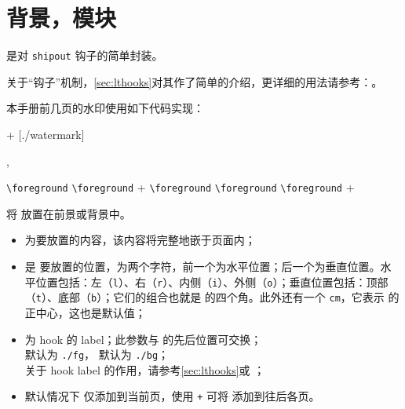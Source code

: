 \documentclass[twoside]{book}
\begin{document}
\section{背景，模块}

 是对 \texttt{shipout} 钩子的简单封装。

关于“钩子”机制，\cref{sec:lthooks}对其作了简单的介绍，更详细的用法请参考：。

本手册前几页的水印使用如下代码实现：
\begin{xample}
\background + [./watermark]{%
  }

\removebackground[./watermark]
\stopxamplecode
\xamplecode
\medskip 
\end{xample}

\begin{function}{\foreground,\background}
  \begin{syntax}
    \verb|\foreground|   
    \verb|\foreground| + 
    \verb|\foreground|  
    \verb|\foreground|  
    \verb|\foreground| +   
  \end{syntax}
将  放置在前景或背景中。

\begin{itemize}[nosep]
  \item {} 为要放置的内容，该内容将完整地嵌于页面内；
  \item {} 是  要放置的位置，为两个字符，前一个为水平位置；后一个为垂直位置。水平位置包括：左（\texttt{l}）、右（\texttt{r}）、内侧（\texttt{i}）、外侧（\texttt{o}）；垂直位置包括：顶部（\texttt{t}）、底部（\texttt{b}）；它们的组合也就是  的四个角。此外还有一个 \texttt{cm}，它表示  的正中心，这也是默认值；
  \item {} 为 hook 的 label；此参数与  的先后位置可交换；\\ 
   默认为 \texttt{./fg}， 默认为 \texttt{./bg}；\\
  关于 hook label 的作用，请参考\cref{sec:lthooks}或 ；
  \item 默认情况下  仅添加到当前页，使用 \texttt{+} 可将  添加到往后各页。
\end{itemize}
\end{function}
\end{document}
